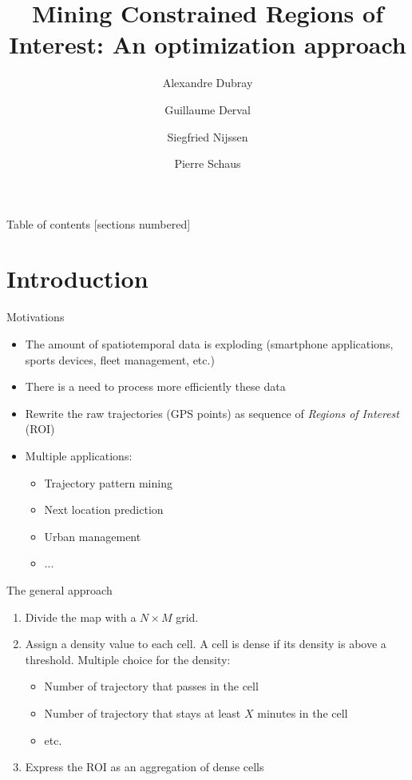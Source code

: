 \documentclass[10pt]{beamer}
\title{Mining Constrained Regions of Interest: An optimization approach}
\date{}
\author{Alexandre Dubray \and Guillaume Derval \and Siegfried Nijssen \and Pierre Schaus}
\institute{}
\begin{document}
\maketitle

\begin{frame}{Table of contents}
  [sections numbered]
  \tableofcontents%
\end{frame}

\section{Introduction}

\begin{frame}{Motivations}
\begin{itemize}
    \item The amount of spatiotemporal data is exploding (smartphone applications, sports devices, fleet management, etc.)
    \item There is a need to process more efficiently these data
    \item Rewrite the raw trajectories (GPS points) as sequence of \emph{Regions of Interest} (ROI)
    \item Multiple applications:
        \begin{itemize}
            \item Trajectory pattern mining
            \item Next location prediction
            \item Urban management
            \item ...
        \end{itemize}
\end{itemize}
\end{frame}

\begin{frame}{The general approach}
    \begin{enumerate}
        \item Divide the map with a $N \times M$ grid.
        \item Assign a density value to each cell. A cell is dense if its density is above a threshold. Multiple choice for the density:
            \begin{itemize}
                \item Number of trajectory that passes in the cell
                \item Number of trajectory that stays at least $X$ minutes in the cell
                \item etc.
            \end{itemize}
        \item Express the ROI as an aggregation of dense cells
    \end{enumerate}
\end{frame}
\end{document}
